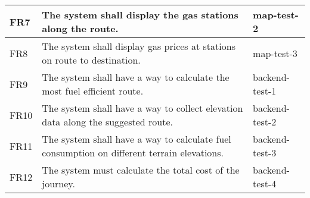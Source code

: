 \documentclass[12pt, titlepage]{article}
\begin{document}
\begin{table}[!hbp]
\begin{tabular}{|p{3.5cm}|p{6.5cm}|p{4.5cm}|}
	FR7                     & The system shall display the gas stations along the route.                                                                                                         & map-test-2                                                                                          \\ \hline
	FR8                    & The system shall display gas prices at stations on route to destination.                                                                                                         & map-test-3                                                                                          \\ \hline
	FR9                     & The system shall have a way to calculate the most fuel efficient route.                                                                                                         & backend-test-1                                                                                          \\ \hline
	FR10                    & The system shall have a way to collect elevation data along the suggested route.                                                                                                         & backend-test-2                                                                                          \\ \hline
	FR11                    & The system shall have a way to calculate fuel consumption on different terrain elevations.                                                                                                         & backend-test-3                                                                                          \\ \hline
	FR12                     & The system must calculate the total cost of the journey.                                                                                                         & backend-test-4                                                                                          \\ \hline
	
	\end{tabular}
	
  \end{table}
  
\end{document}
